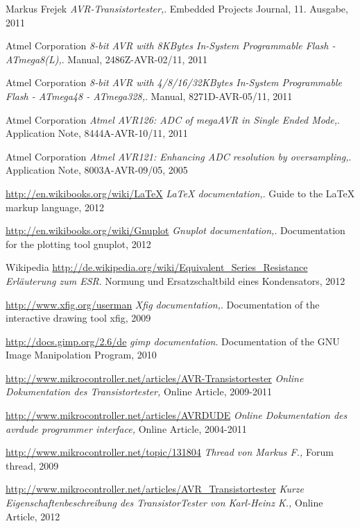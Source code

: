 \documentclass[pdftex,12pt,a4paper,oneside,english]{report}
\begin{document}
\begin{thebibliography}{99}

Markus Frejek
\emph{AVR-Transistortester,}.
Embedded Projects Journal,
11. Ausgabe,
2011

Atmel Corporation
\emph{8-bit AVR with 8KBytes In-System Programmable Flash - ATmega8(L),}.
Manual,
2486Z-AVR-02/11,
2011

Atmel Corporation
\emph{8-bit AVR with 4/8/16/32KBytes In-System Programmable Flash - ATmega48 - ATmega328,}.
Manual,
8271D-AVR-05/11,
2011

Atmel Corporation
\emph{Atmel AVR126: ADC of megaAVR in Single Ended Mode,}.
Application Note,
8444A-AVR-10/11,
2011

Atmel Corporation
\emph{Atmel AVR121: Enhancing ADC resolution by oversampling,}.
Application Note,
8003A-AVR-09/05,
2005

\url{http://en.wikibooks.org/wiki/LaTeX}
\emph{LaTeX documentation,}.
Guide to the LaTeX markup language,
2012

\url{http://en.wikibooks.org/wiki/Gnuplot}
\emph{Gnuplot documentation,}.
Documentation for the plotting tool gnuplot,
2012

Wikipedia
\url{http://de.wikipedia.org/wiki/Equivalent_Series_Resistance}
\emph{Erläuterung zum ESR}.
Normung und Ersatzschaltbild eines Kondensators,
2012

\url{http://www.xfig.org/userman}
\emph{Xfig documentation,}.
Documentation of the interactive drawing tool xfig,
2009

\url{http://docs.gimp.org/2.6/de}
\emph{gimp documentation}.
Documentation of the GNU Image Manipolation Program,
2010

\url{http://www.mikrocontroller.net/articles/AVR-Transistortester}
\emph{Online Dokumentation des Transistortester,}
Online Article,
2009-2011

\url{http://www.mikrocontroller.net/articles/AVRDUDE}
\emph{Online Dokumentation des avrdude programmer interface,}
Online Article,
2004-2011

\url{http://www.mikrocontroller.net/topic/131804}
\emph{Thread von Markus F.,}
Forum thread, 
2009

\url{http://www.mikrocontroller.net/articles/AVR\_Transistortester}
\emph{Kurze Eigenschaftenbeschreibung des TransistorTester von Karl-Heinz K.,}
Online Article,
2012


\end{thebibliography}
\end{document}
